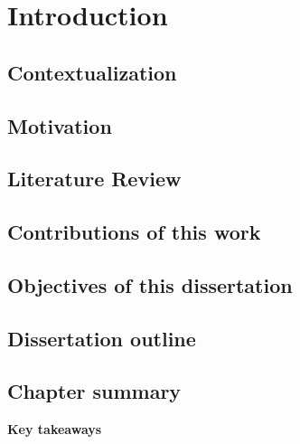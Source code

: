 \chapter{Introduction}
\label{cap:introduction}

\section{Contextualization}
    \blindtext[1]
 
\section{Motivation}
    \blindtext[1]

\section{Literature Review}
    \blindtext[1]

\section{Contributions of this work}
    \blindtext[1]

\section{Objectives of this dissertation}
    \blindtext[1]

\section{Dissertation outline}
    \blindtext[1]

\section{Chapter summary}
    \begin{mdframed}[style=plainSty,innertopmargin=8pt] %
        {\center \textbf{\sffamily Key takeaways} \par}
        \noindent 
        \blindtext[1]
    \end{mdframed}